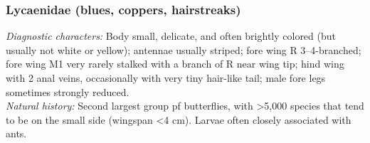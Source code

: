 \documentclass[letterpaper, 11pt]{article}
\begin{document}
\subsubsection{Lycaenidae (blues, coppers, hairstreaks)}
\noindent{}\textit{Diagnostic characters:} Body small, delicate, and often brightly colored (but usually not white or yellow); antennae usually striped; fore wing R 3--4-branched; fore wing M1 very rarely stalked with a branch of R near wing tip; hind wing with 2 anal veins, occasionally with very tiny hair-like tail; male fore legs sometimes strongly reduced.\\

\noindent{}\textit{Natural history:} Second largest group pf butterflies, with \textgreater{}5,000 species that tend to be on the small side (wingspan \textless4 cm). Larvae often closely associated with ants. 
\end{document}
